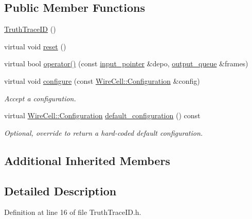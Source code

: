 \subsection*{Public Member Functions}
\begin{DoxyCompactItemize}
\item 
\hyperlink{class_wire_cell_1_1_gen_1_1_truth_trace_i_d_a3b0e9e666df11f7d4f639a5f1ee32059}{Truth\+Trace\+ID} ()
\item 
virtual void \hyperlink{class_wire_cell_1_1_gen_1_1_truth_trace_i_d_aedeb529661e4353e8666b9b59395b7b5}{reset} ()
\item 
virtual bool \hyperlink{class_wire_cell_1_1_gen_1_1_truth_trace_i_d_ac96b5f808d28d0197ee9434100f43adc}{operator()} (const \hyperlink{class_wire_cell_1_1_i_queuedout_node_acf5f716a764553f3c7055a9cf67e906e}{input\+\_\+pointer} \&depo, \hyperlink{class_wire_cell_1_1_i_queuedout_node_a39018e4e3dd886befac9636ac791a685}{output\+\_\+queue} \&frames)
\item 
virtual void \hyperlink{class_wire_cell_1_1_gen_1_1_truth_trace_i_d_adeed1a28e9ed6d5da7e07378b172bd48}{configure} (const \hyperlink{namespace_wire_cell_a9f705541fc1d46c608b3d32c182333ee}{Wire\+Cell\+::\+Configuration} \&config)
\begin{DoxyCompactList}\small\item\em Accept a configuration. \end{DoxyCompactList}\item 
virtual \hyperlink{namespace_wire_cell_a9f705541fc1d46c608b3d32c182333ee}{Wire\+Cell\+::\+Configuration} \hyperlink{class_wire_cell_1_1_gen_1_1_truth_trace_i_d_a315b5e6491134d84248cfc2ed8f8e0b1}{default\+\_\+configuration} () const
\begin{DoxyCompactList}\small\item\em Optional, override to return a hard-\/coded default configuration. \end{DoxyCompactList}\end{DoxyCompactItemize}
\subsection*{Additional Inherited Members}


\subsection{Detailed Description}


Definition at line 16 of file Truth\+Trace\+I\+D.\+h.



